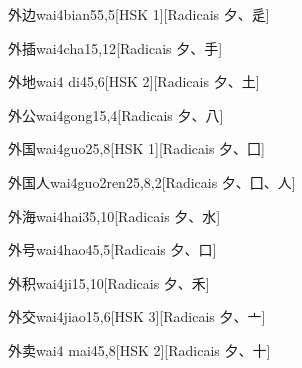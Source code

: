 \begin{entry}{外边}{wai4bian5}{5,5}[HSK 1][Radicais ⼣、⾡]
\end{entry}

\begin{entry}{外插}{wai4cha1}{5,12}[Radicais ⼣、⼿]
\end{entry}

\begin{entry}{外地}{wai4 di4}{5,6}[HSK 2][Radicais ⼣、⼟]
\end{entry}

\begin{entry}{外公}{wai4gong1}{5,4}[Radicais ⼣、⼋]
\end{entry}

\begin{entry}{外国}{wai4guo2}{5,8}[HSK 1][Radicais ⼣、⼞]
\end{entry}

\begin{entry}{外国人}{wai4guo2ren2}{5,8,2}[Radicais ⼣、⼞、⼈]
\end{entry}

\begin{entry}{外海}{wai4hai3}{5,10}[Radicais ⼣、⽔]
\end{entry}

\begin{entry}{外号}{wai4hao4}{5,5}[Radicais ⼣、⼝]
\end{entry}

\begin{entry}{外积}{wai4ji1}{5,10}[Radicais ⼣、⽲]
\end{entry}

\begin{entry}{外交}{wai4jiao1}{5,6}[HSK 3][Radicais ⼣、⼇]
\end{entry}

\begin{entry}{外卖}{wai4 mai4}{5,8}[HSK 2][Radicais ⼣、⼗]
\end{entry}

